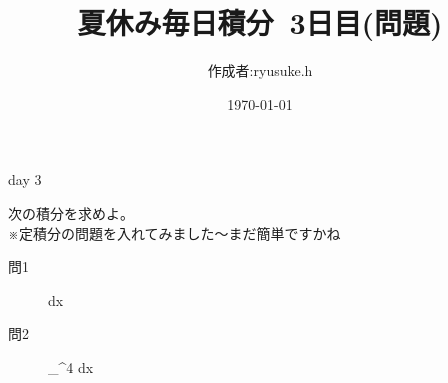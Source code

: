 \documentclass[12pt,a4paper]{jsarticle}
\title{夏休み毎日積分~3日目(問題)}
\date{\today}
\begin{document}
\maketitle
\begin{flushright}
    \author{作成者:ryusuke.h}
\end{flushright}
\begin{itembox}[c]{day 3 }
    \begin{center}
        次の積分を求めよ。\\
        ※定積分の問題を入れてみました〜まだ簡単ですかね
    \end{center}
\end{itembox}
\begin{description}
    \item [問1] {\displaystyle} \int {} dx
\end{description}
\begin{description}
    \item [問2] {\displaystyle} \int_^4   dx
\end{description}
\end{document}
